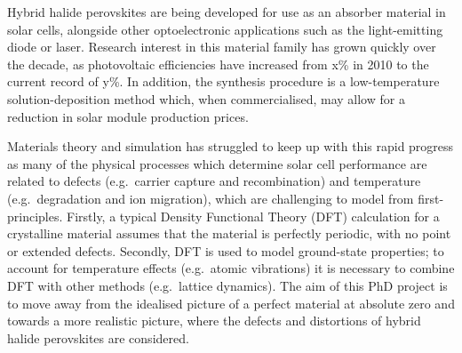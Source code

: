 Hybrid halide perovskites are being developed for use as an absorber material in solar cells, alongside other optoelectronic applications such as the light-emitting diode or laser. Research interest in this material family has grown quickly over the decade, as photovoltaic efficiencies have increased from x\% in 2010 to the current record of y\%.  In addition, the synthesis procedure is a low-temperature solution-deposition method which, when commercialised, may allow for a reduction in solar module production prices. 

Materials theory and simulation has struggled to keep up with this rapid progress as many of the physical processes which determine solar cell performance are related to defects (e.g.\ carrier capture and recombination) and temperature (e.g.\ degradation and ion migration), which are challenging to model from first-principles. Firstly, a typical Density Functional Theory (DFT) calculation for a crystalline material assumes that the material is perfectly periodic, with no point or extended defects. Secondly, DFT is used to model ground-state properties; to account for temperature effects (e.g.\ atomic vibrations) it is necessary to combine DFT with other methods (e.g.\ lattice dynamics). The aim of this PhD project is to move away from the idealised picture of a perfect material at absolute zero and towards a more realistic picture, where the defects and distortions of hybrid halide perovskites are considered.